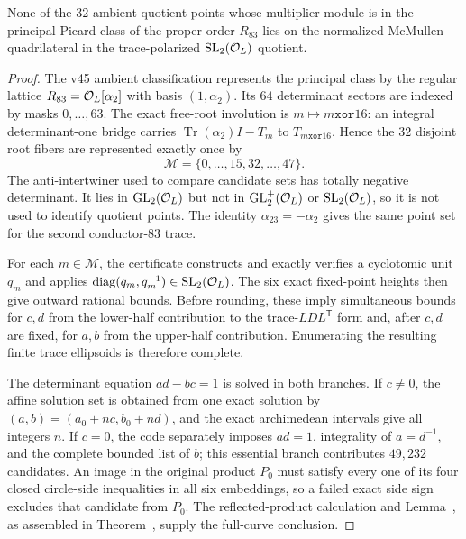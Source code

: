 \begin{theorem}
\label{thm:d7r83principal}
None of the $32$ ambient quotient points whose multiplier module is in the
principal Picard class of the proper order $R_{83}$ lies on the normalized
McMullen quadrilateral in the trace-polarized
$\mathrm{SL}_2(\mathcal O_L)$ quotient.
\end{theorem}
\begin{proof}
The v45 ambient classification represents the principal class by the regular
lattice $R_{83}=\mathcal O_L[\alpha_2]$ with basis $(1,\alpha_2)$. Its $64$
determinant sectors are indexed by masks $0,\ldots,63$. The exact free-root
involution is $m\mapsto m\mathbin{\mathtt{xor}}16$: an integral
determinant-one bridge carries
$\operatorname{Tr}(\alpha_2)I-T_m$ to
$T_{m\mathbin{\mathtt{xor}}16}$. Hence the $32$
disjoint root fibers are represented exactly once by
\[
 \mathcal M=\{0,\ldots,15,32,\ldots,47\}.
\]
The anti-intertwiner used to compare candidate sets has totally negative
determinant. It lies in $\operatorname{GL}_2(\mathcal O_L)$ but not in $\operatorname{GL}_2^+(\mathcal O_L)$ or
$\operatorname{SL}_2(\mathcal O_L)$, so it is not used to identify quotient points. The identity
$\alpha_{23}=-\alpha_2$ gives the same point set for the second conductor-$83$
trace.

For each $m\in\mathcal M$, the certificate constructs and exactly verifies a
cyclotomic unit $q_m$ and applies
$\operatorname{diag}(q_m,q_m^{-1})\in\mathrm{SL}_2(\mathcal O_L)$.  The six exact fixed-point
heights then give outward rational bounds.  Before rounding, these imply
simultaneous bounds for $c,d$ from the lower-half contribution to the
trace-$LDL^{\mathsf T}$ form and, after $c,d$ are fixed, for $a,b$ from the
upper-half contribution.  Enumerating the resulting finite trace ellipsoids
is therefore complete.

The determinant equation $ad-bc=1$ is solved in both branches.  If $c\ne0$,
the affine solution set is obtained from one exact solution by
$(a,b)=(a_0+nc,b_0+nd)$, and the exact archimedean intervals give all integers
$n$.  If $c=0$, the code separately imposes $ad=1$, integrality of $a=d^{-1}$,
and the complete bounded list of $b$; this essential branch contributes
$49{,}232$ candidates. An image in the original product $P_0$
must satisfy every one of its four closed circle-side inequalities in
all six embeddings, so a failed exact side sign excludes that candidate
from $P_0$. The reflected-product calculation and
Lemma~, as assembled in
Theorem~, supply the full-curve conclusion.


\end{proof}
